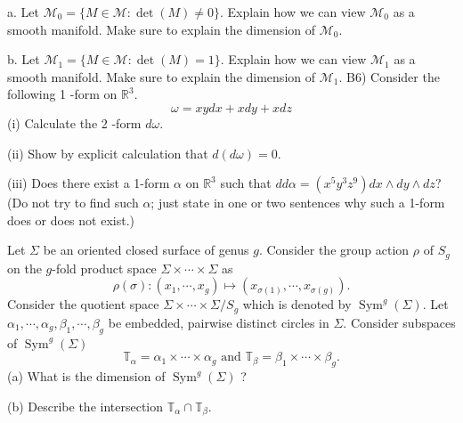 \documentclass[10pt]{article}
\begin{document}
a. Let $\mathcal{M}_{0}=\{M \in \mathcal{M}: \operatorname{det}(M) \neq 0\}$. Explain how we can view $\mathcal{M}_{0}$ as a smooth manifold. Make sure to explain the dimension of $\mathcal{M}_{0}$.

b. Let $\mathcal{M}_{1}=\{M \in \mathcal{M}: \operatorname{det}(M)=1\}$. Explain how we can view $\mathcal{M}_{1}$ as a smooth manifold. Make sure to explain the dimension of $\mathcal{M}_{1}$.
\newpage
B6) Consider the following 1 -form on $\mathbb{R}^{3}$.
$$
\omega=x y d x+x d y+x d z
$$
(i) Calculate the 2 -form $d \omega$.

(ii) Show by explicit calculation that $d(d \omega)=0$.

(iii) Does there exist a 1-form $\alpha$ on $\mathbb{R}^{3}$ such that $d d \alpha=\left(x^{5} y^{3} z^{9}\right) d x \wedge d y \wedge d z ?$ (Do not try to find such $\alpha$; just state in one or two sentences why such a 1-form does or does not exist.)

\newpage
Let $\Sigma$ be an oriented closed surface of genus $g$. Consider the group action $\rho$ of $S_{g}$ on the $g$-fold product space $\Sigma \times \cdots \times \Sigma$ as
$$
\rho(\sigma):\left(x_{1}, \cdots, x_{g}\right) \mapsto\left(x_{\sigma(1)}, \cdots, x_{\sigma(g)}\right) .
$$
Consider the quotient space $\Sigma \times \cdots \times \Sigma / S_{g}$ which is denoted by $\operatorname{Sym}^{g}(\Sigma)$. Let $\alpha_{1}, \cdots, \alpha_{g}, \beta_{1}, \cdots, \beta_{g}$ be embedded, pairwise distinct circles in $\Sigma$. Consider subspaces of $\operatorname{Sym}^{g}(\Sigma)$
$$
\mathbb{T}_{\alpha}=\alpha_{1} \times \cdots \times \alpha_{g} \text { and } \mathbb{T}_{\beta}=\beta_{1} \times \cdots \times \beta_{g} .
$$
(a) What is the dimension of $\operatorname{Sym}^{g}(\Sigma)$ ?

(b) Describe the intersection $\mathbb{T}_{\alpha} \cap \mathbb{T}_{\beta}$.
\end{document}
